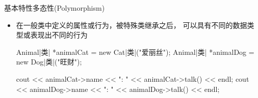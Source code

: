 \begin{frame}[fragile]{基本特性}{多态性(Polymorphism)}
  \begin{itemize}
  \item 在\alert{一般类}中定义的属性或行为，被\alert{特殊类继承}之后，
    可以具有不同的数据类型或表现出\alert{不同的行为}\\
    \begin{minipage}{0.8\linewidth}
      \begin{cpptt}
Animal|类| *animalCat = new Cat|类|("爱丽丝");
Animal|类| *animalDog = new Dog|类|("旺财");

cout << animalCat->name << ": " << animalCat->talk() << endl;
cout << animalDog->name << ": " << animalDog->talk() << endl;
      \end{cpptt}
    \end{minipage}
  \end{itemize}
  
  \begin{center}
\end{center}
\end{frame}


